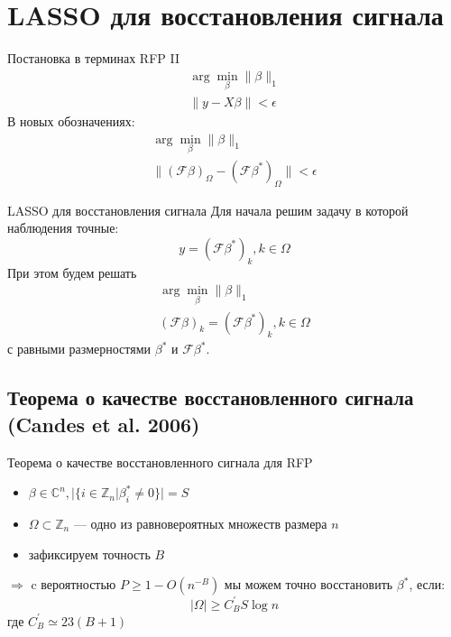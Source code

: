 \documentclass[14pt, fleqn, xcolor={dvipsnames, table}]{beamer}
\begin{document}
\section{LASSO для восстановления сигнала}

\begin{frame}{Постановка в терминах RFP II}
  $$\begin{array}{l}
  \arg \min_\beta\|\beta\|_1\\
  \|y - X\beta\| < \epsilon
  \end{array}$$
 В новых обозначениях:
$$\begin{array}{l}
\arg \min_\beta \|\beta\|_1 \\
\|(\mathcal{F}\beta)_\Omega - (\mathcal{F}\beta^*)_\Omega\| < \epsilon
\end{array}$$
\end{frame}

\begin{frame}{LASSO для восстановления сигнала}
Для начала решим задачу в которой наблюдения точные:
$$
y = (\mathcal{F}\beta^*)_k, k \in \Omega
$$
При этом будем решать 
$$\begin{array}{l}
\arg \min_\beta \|\beta\|_1 \\
(\mathcal{F}\beta)_k = (\mathcal{F}\beta^*)_k, k \in \Omega
\end{array}$$
с равными размерностями $\beta^*$ и $\mathcal{F}\beta^*$.
\end{frame}


\subsection{Теорема о качестве восстановленного сигнала (Candes et al. 2006)}
\begin{frame}{Теорема о качестве восстановленного сигнала для RFP}
\small
\begin{theorem}[Candes et al. (2006)]
\begin{itemize}
\item[] $\beta\in\mathbb{C}^n, |\{i \in \mathbb{Z}_n|\beta^*_i \ne 0\}| = S$ 
\item[] $\Omega \subset \mathbb{Z}_n$ --- одно из равновероятных множеств размера $n$
\item[] зафиксируем точность $B$
\end{itemize}
$\Rightarrow$ c вероятностью $P \ge 1 - O(n^{-B})$ мы можем точно восстановить $\beta^*$, если:
$$
|\Omega| \ge C^{'}_B S \log n
$$
где $C^{'}_B \simeq 23(B + 1)$
\end{theorem}
\end{frame}
\end{document}
